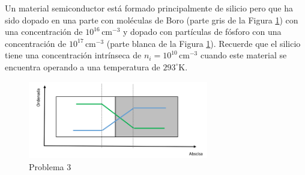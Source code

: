 \documentclass[
  11pt,
  letterpaper,
   addpoints,
   answers
  ]{exam}
\begin{document}
\begin{questions}
\question
Un material semiconductor está formado principalmente de silicio pero que ha sido dopado en una parte con moléculas de Boro (parte gris de la Figura \ref{fig:p3}) con una concentración de $10^{16}\,\text{cm}^{-3}$ y dopado con partículas de fósforo con una concentración de $10^{17}\,\text{cm}^{-3}$ (parte blanca de la Figura \ref{fig:p3}). Recuerde que el silicio tiene una concentración intrínseca de $n_i = 10^{10}\,\text{cm}^{-3}$ cuando este material se encuentra operando a una temperatura de $293^\circ \text{K}$.


\begin{figure}[H]
    \centering
    \includegraphics[width=0.7\textwidth]{../figures/Auxiliar_2_1}
    \caption{Problema 3}
    \label{fig:p3}
\end{figure}


\end{questions}
\end{document}
